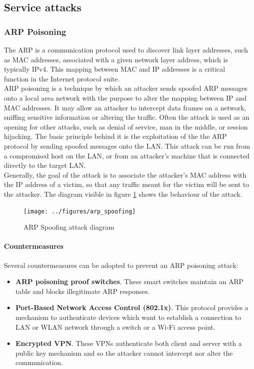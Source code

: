 \documentclass[final]{article}
\begin{document}
\subsection{Service attacks}
\subsubsection{ARP Poisoning}
The \ac{ARP} is a communication protocol used to discover link layer addresses,
such as MAC addresses, associated with a given network layer address, which is typically IPv4.
This mapping between MAC and IP addresses is a critical function in the Internet protocol suite. \\
\ac{ARP} poisoning is a technique by which an attacker sends spoofed \ac{ARP} messages
onto a local area network with the purpose to alter the mapping between IP and MAC addresses.
It may allow an attacker to intercept data frames on a network, sniffing sensitive information or altering the traffic.
Often the attack is used as an opening for other attacks,
such as denial of service, man in the middle, or session hijacking.
The basic principle behind it is the exploitation of the the
\ac{ARP} protocol by sending spoofed messages onto the LAN.
This attack can be run from a compromised host on the LAN,
or from an attacker's machine that is connected directly to the target LAN.\\
Generally, the goal of the attack is to associate the attacker's MAC address
with the IP address of a victim, so that any traffic meant for the victim
will be sent to the attacker.
The diagram visible in figure \ref{arp_spoofing} shows the behaviour of the attack.
\begin{figure}
  \center
  \texttt{[image: ../figures/arp\_spoofing]}
  \caption{ARP Spoofing attack diagram}
  \label{arp_spoofing}
\end{figure}

\paragraph{Countermeasures}
Several countermeasures can be adopted to prevent an \ac{ARP} poisoning attack:
\begin{itemize}
  \item \textbf{\ac{ARP} poisoning proof switches}. These smart switches maintain an \ac{ARP} table and blocks illegitimate ARP responses.
  \item \textbf{Port-Based Network Access Control (802.1x)}. This protocol provides a mechanism to authenticate devices which want to establish a connection to LAN or WLAN network through a switch or a Wi-Fi access point.
  \item \textbf{Encrypted VPN}. These VPNs authenticate both client and server with a public key mechanism and so the attacker cannot intercept nor alter the communication.
\end{itemize}
\end{document}
